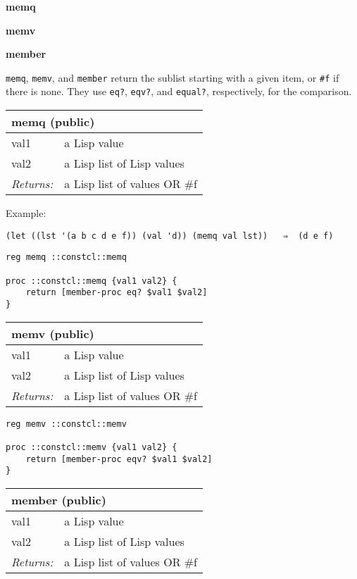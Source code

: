 \documentclass{report}
\begin{document}
\textbf{memq}


\textbf{memv}


\textbf{member}


\texttt{memq}, \texttt{memv}, and \texttt{member} return the sublist starting with a given item, or \texttt{\#f} if there is none. They use \texttt{eq?}, \texttt{eqv?}, and \texttt{equal?}, respectively, for the comparison.

\begin{tabular}{ |l l| }
\hline
\multicolumn{2}{|l|}{memq (public)} \\
\hline
val1 & a Lisp value \\
val2 & a Lisp list of Lisp values \\
\textit{Returns:} & a Lisp list of values OR \#f \\
\hline
\end{tabular}


Example:

\noindent\makebox[\linewidth]{\rule{\linewidth}{0.4pt}}
\begin{lstlisting}
(let ((lst '(a b c d e f)) (val 'd)) (memq val lst))   ⇒  (d e f)
\end{lstlisting}
\noindent\makebox[\linewidth]{\rule{\linewidth}{0.4pt}}
\noindent\makebox[\linewidth]{\rule{\linewidth}{0.4pt}}
\begin{lstlisting}
reg memq ::constcl::memq
 
proc ::constcl::memq {val1 val2} {
    return [member-proc eq? $val1 $val2]
}
\end{lstlisting}
\noindent\makebox[\linewidth]{\rule{\linewidth}{0.4pt}}
\begin{tabular}{ |l l| }
\hline
\multicolumn{2}{|l|}{memv (public)} \\
\hline
val1 & a Lisp value \\
val2 & a Lisp list of Lisp values \\
\textit{Returns:} & a Lisp list of values OR \#f \\
\hline
\end{tabular}

\noindent\makebox[\linewidth]{\rule{\linewidth}{0.4pt}}
\begin{lstlisting}
reg memv ::constcl::memv
 
proc ::constcl::memv {val1 val2} {
    return [member-proc eqv? $val1 $val2]
}
\end{lstlisting}
\noindent\makebox[\linewidth]{\rule{\linewidth}{0.4pt}}
\begin{tabular}{ |l l| }
\hline
\multicolumn{2}{|l|}{member (public)} \\
\hline
val1 & a Lisp value \\
val2 & a Lisp list of Lisp values \\
\textit{Returns:} & a Lisp list of values OR \#f \\
\hline
\end{tabular}
\end{document}
